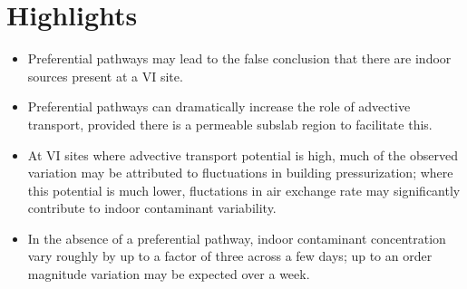 \documentclass{article}
\begin{document}
\section*{Highlights}

\begin{itemize}
  \item Preferential pathways may lead to the false conclusion that there are indoor sources present at a VI site.
  \item Preferential pathways can dramatically increase the role of advective transport, provided there is a permeable subslab region to facilitate this.
  \item At VI sites where advective transport potential is high, much of the observed variation may be attributed to fluctuations in building pressurization; where this potential is much lower, fluctations in air exchange rate may significantly contribute to indoor contaminant variability.
  \item In the absence of a preferential pathway, indoor contaminant concentration vary roughly by up to a factor of three across a few days; up to an order magnitude variation may be expected over a week.
\end{itemize}
\end{document}
